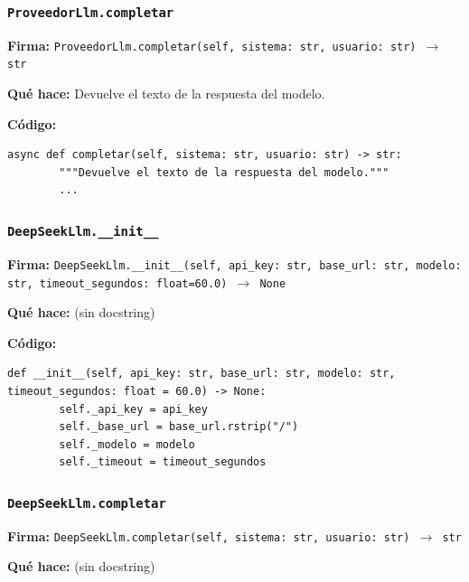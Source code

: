 \documentclass[11pt,a4paper]{article}
\begin{document}
\subsubsection*{\texttt{ProveedorLlm.completar}}
\textbf{Firma:} \texttt{ProveedorLlm.completar(self, sistema: str, usuario: str) $\rightarrow$ str}

\textbf{Qué hace:} Devuelve el texto de la respuesta del modelo.

\textbf{Código:}
\begin{lstlisting}
async def completar(self, sistema: str, usuario: str) -> str:
        """Devuelve el texto de la respuesta del modelo."""
        ...
\end{lstlisting}

\subsubsection*{\texttt{DeepSeekLlm.\_\_init\_\_}}
\textbf{Firma:} \texttt{DeepSeekLlm.\_\_init\_\_(self, api\_key: str, base\_url: str, modelo: str, timeout\_segundos: float=60.0) $\rightarrow$ None}

\textbf{Qué hace:} (sin docstring)

\textbf{Código:}
\begin{lstlisting}
def __init__(self, api_key: str, base_url: str, modelo: str, timeout_segundos: float = 60.0) -> None:
        self._api_key = api_key
        self._base_url = base_url.rstrip("/")
        self._modelo = modelo
        self._timeout = timeout_segundos
\end{lstlisting}

\subsubsection*{\texttt{DeepSeekLlm.completar}}
\textbf{Firma:} \texttt{DeepSeekLlm.completar(self, sistema: str, usuario: str) $\rightarrow$ str}

\textbf{Qué hace:} (sin docstring)
\end{document}
